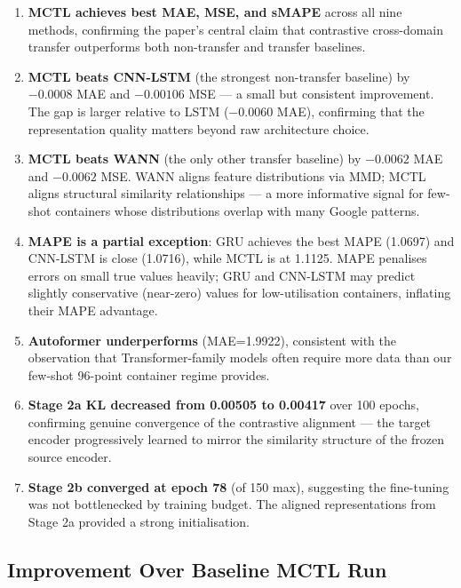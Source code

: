 \documentclass[12pt,a4paper]{article}
\begin{document}
\begin{enumerate}
    \item \textbf{MCTL achieves best MAE, MSE, and sMAPE} across all nine methods,
    confirming the paper's central claim that contrastive cross-domain transfer
    outperforms both non-transfer and transfer baselines.

    \item \textbf{MCTL beats CNN-LSTM} (the strongest non-transfer baseline) by
    $-0.0008$ MAE and $-0.00106$ MSE — a small but consistent improvement.
    The gap is larger relative to LSTM ($-0.0060$ MAE), confirming that the
    representation quality matters beyond raw architecture choice.

    \item \textbf{MCTL beats WANN} (the only other transfer baseline) by
    $-0.0062$ MAE and $-0.0062$ MSE.  WANN aligns feature distributions via
    MMD; MCTL aligns structural similarity relationships — a more informative
    signal for few-shot containers whose distributions overlap with many
    Google patterns.

    \item \textbf{MAPE is a partial exception}: GRU achieves the best MAPE
    (1.0697) and CNN-LSTM is close (1.0716), while MCTL is at 1.1125.
    MAPE penalises errors on small true values heavily; GRU and CNN-LSTM
    may predict slightly conservative (near-zero) values for low-utilisation
    containers, inflating their MAPE advantage.

    \item \textbf{Autoformer underperforms} (MAE=1.9922), consistent with the
    observation that Transformer-family models often require more data than
    our few-shot 96-point container regime provides.

    \item \textbf{Stage 2a KL decreased from 0.00505 to 0.00417} over 100 epochs,
    confirming genuine convergence of the contrastive alignment — the target
    encoder progressively learned to mirror the similarity structure of the
    frozen source encoder.

    \item \textbf{Stage 2b converged at epoch 78} (of 150 max), suggesting the
    fine-tuning was not bottlenecked by training budget.  The aligned
    representations from Stage 2a provided a strong initialisation.
\end{enumerate}

\subsection{Improvement Over Baseline MCTL Run}
\end{document}
